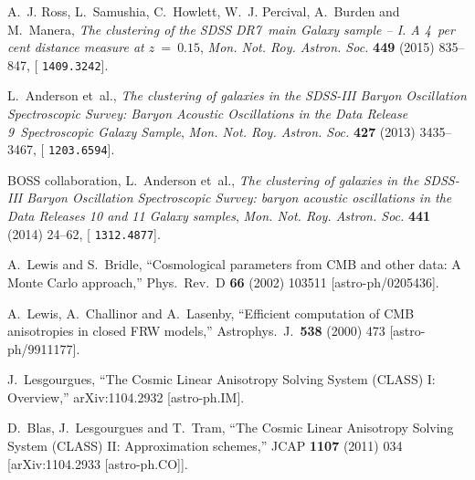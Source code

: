 \documentclass[11pt,a4paper]{article}
\renewcommand\({\left(}
\renewcommand\){\right)}
\renewcommand\[{\left[}
\renewcommand\]{\right]}
\begin{document}
\begin{thebibliography}{10}
A.~J. Ross, L.~Samushia, C.~Howlett, W.~J. Percival, A.~Burden and M.~Manera,
  \emph{{The clustering of the SDSS DR7~{m}ain Galaxy sample -- I. A 4{~}per
  cent distance measure at $z{~}={~}0.15$}},
  {\emph{Mon. Not. Roy. Astron.
  Soc.} {\bf 449} (2015) 835--847}, [%
  {{\tt 1409.3242}}].

L.~Anderson et~al., \emph{{The clustering of galaxies in the SDSS-III Baryon
  Oscillation Spectroscopic Survey: Baryon Acoustic Oscillations in the Data
  Release 9~{S}pectroscopic Galaxy Sample}},
  {\emph{Mon. Not.
  Roy. Astron. Soc.} {\bf 427} (2013) 3435--3467},
  [%
  {{\tt 1203.6594}}].

{\scshape BOSS} collaboration, L.~Anderson et~al., \emph{{The clustering of
  galaxies in the SDSS-III Baryon Oscillation Spectroscopic Survey: baryon
  acoustic oscillations in the Data Releases 10 and 11 Galaxy samples}},
  {\emph{Mon. Not. Roy. Astron.
  Soc.} {\bf 441} (2014) 24--62}, [
  {{\tt 1312.4877}}].
  
  A.~Lewis and S.~Bridle,
  ``Cosmological parameters from CMB and other data: A Monte Carlo approach,''
  Phys.\ Rev.\ D {\bf 66} (2002) 103511
  [astro-ph/0205436].
  

  A.~Lewis, A.~Challinor and A.~Lasenby,
  ``Efficient computation of CMB anisotropies in closed FRW models,''
  Astrophys.\ J.\  {\bf 538} (2000) 473
  [astro-ph/9911177].
  
  J.~Lesgourgues,
  ``The Cosmic Linear Anisotropy Solving System (CLASS) I: Overview,''
  arXiv:1104.2932 [astro-ph.IM].
  
  D.~Blas, J.~Lesgourgues and T.~Tram,
  ``The Cosmic Linear Anisotropy Solving System (CLASS) II: Approximation schemes,''
  JCAP {\bf 1107} (2011) 034
  [arXiv:1104.2933 [astro-ph.CO]].
  

\end{thebibliography}
\end{document}
